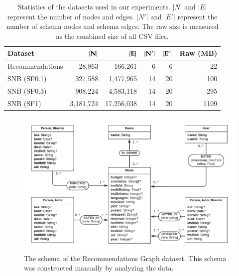 \documentclass{report}
\theoremstyle{definition}
\begin{document}
\begin{table}[t]
  \centering
  \begin{tabular}{lrrrrr}
    \hline
    \textbf{Dataset} & $\bf{|N|}$ & $\bf{|E|}$ & $\bf{|N'|}$ & $\bf{|E'|}$ & \textbf{Raw (MB)} \\
    \hline
    Recommendations  & 28,863     & 166,261    & 6           & 6           & 22                \\
    SNB (SF0.1)      & 327,588    & 1,477,965  & 14          & 20          & 100               \\
    SNB (SF0.3)      & 908,224    & 4,583,118  & 14          & 20          & 295               \\
    SNB (SF1)        & 3,181,724  & 17,256,038 & 14          & 20          & 1109              \\
    \hline
  \end{tabular}
  \caption[Statistics of the datasets used in our experiments]{Statistics of the datasets used in our experiments. $|N|$ and $|E|$ represent the number of nodes and edges. $|N'|$ and $|E'|$ represent the number of schema nodes and schema edges. The raw size is measured as the combined size of all CSV files.}
  \label{tab:dataset-statistics}
\end{table}

\begin{figure}[t]
  \centering
  \includegraphics[width=\textwidth]{figures/schema-recommendations.pdf}
  \caption[The schema of the Recommendations Graph dataset]{The schema of the Recommendations Graph dataset. This schema was constructed manually by analyzing the data.}
  \label{fig:schema-recommendations}
\end{figure}
\end{document}
